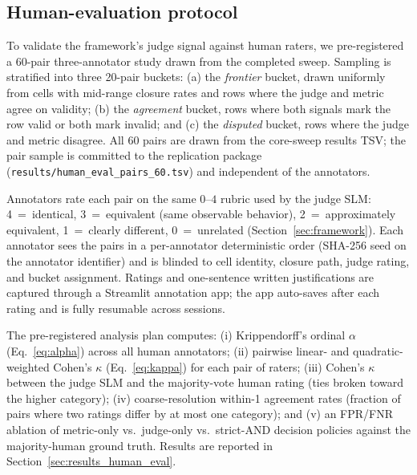 \subsection{Human-evaluation protocol}
\label{sec:experiment_setup_human_eval}

To validate the framework's judge signal against human raters, we
pre-registered a 60-pair three-annotator study drawn from the completed
sweep. Sampling is stratified into three 20-pair buckets: (a) the
\emph{frontier} bucket, drawn uniformly from cells with mid-range
closure rates and rows where the judge and metric agree on validity;
(b) the \emph{agreement} bucket, rows where both signals mark the row
valid or both mark invalid; and (c) the \emph{disputed} bucket, rows
where the judge and metric disagree. All 60 pairs are drawn from the
core-sweep results TSV; the pair sample is committed to the replication
package (\texttt{results/human\_eval\_pairs\_60.tsv}) and independent of
the annotators.

Annotators rate each pair on the same $0$--$4$ rubric used by the judge
SLM: 4~=~identical, 3~=~equivalent (same observable behavior),
2~=~approximately equivalent, 1~=~clearly different, 0~=~unrelated
(Section~\ref{sec:framework}). Each annotator sees the pairs in a
per-annotator deterministic order (SHA-256 seed on the annotator
identifier) and is blinded to cell identity, closure path, judge
rating, and bucket assignment. Ratings and one-sentence written
justifications are captured through a Streamlit annotation app; the
app auto-saves after each rating and is fully resumable across
sessions.

The pre-registered analysis plan computes: (i) Krippendorff's ordinal
$\alpha$ (Eq.~\ref{eq:alpha}) across all human annotators; (ii)
pairwise linear- and quadratic-weighted Cohen's $\kappa$
(Eq.~\ref{eq:kappa}) for each pair of raters; (iii) Cohen's $\kappa$
between the judge SLM and the majority-vote human rating (ties broken
toward the higher category); (iv) coarse-resolution within-1 agreement
rates (fraction of pairs where two ratings differ by at most one
category); and (v) an FPR/FNR ablation of metric-only vs.\ judge-only
vs.\ strict-AND decision policies against the majority-human ground
truth. Results are reported in Section~\ref{sec:results_human_eval}.


